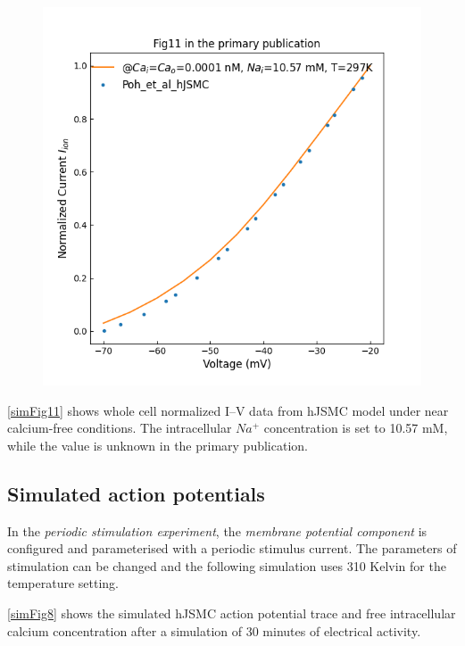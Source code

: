 \documentclass[fleqn,10pt]{physiome}
\begin{document}
\begin{figure}
\begin{minipage}{.5\textwidth}
  \includegraphics[width=\linewidth]{./figs/simFig11.png}
  \label{simFig11}
\end{minipage}
\end{figure}

\autoref{simFig11} shows whole cell normalized I–V data from hJSMC model under near calcium-free conditions. The intracellular $Na^+$ concentration is set to 10.57 mM, while the value is unknown in the primary publication.

\subsection{Simulated action potentials}
In the \emph{periodic stimulation experiment}, the \emph{membrane potential component} is configured and parameterised with a periodic stimulus current. The parameters of stimulation can be changed and the following simulation uses 310 Kelvin for the temperature setting.

\autoref{simFig8} shows the simulated hJSMC action potential trace and free intracellular calcium concentration after a simulation of 30 minutes of electrical activity.
\end{document}
